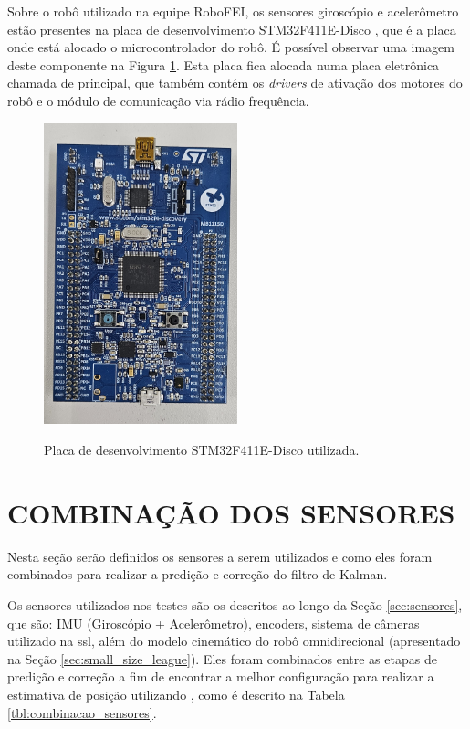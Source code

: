 \documentclass[acronym, symbols, table, deposito]{fei}
\begin{document}
		Sobre o robô utilizado na equipe RoboFEI, os sensores giroscópio e acelerômetro estão presentes na placa de desenvolvimento STM32F411E-Disco \cite{datasheet_micro}, que é a placa onde está alocado o microcontrolador do robô. É possível observar uma imagem deste componente na Figura \ref{fig:stm32f411}. Esta placa fica alocada numa placa eletrônica chamada de principal, que também contém os \textit{drivers} de ativação dos motores do robô e o módulo de comunicação via rádio frequência.
		
		\begin{figure}[!htb]
			\centering
			\caption{Placa de desenvolvimento STM32F411E-Disco utilizada.}
			\includegraphics[width=0.5\textwidth]{stm32f411.jpg}
			\label{fig:stm32f411}
		\end{figure}
		
	\section{COMBINAÇÃO DOS SENSORES}\label{sec:metodologia_comb_sensores}
	
		Nesta seção serão definidos os sensores a serem utilizados e como eles foram combinados para realizar a predição e correção do filtro de Kalman.
		
		Os sensores utilizados nos testes são os descritos ao longo da Seção \ref{sec:sensores}, que são: IMU (Giroscópio + Acelerômetro), encoders, sistema de câmeras utilizado na \acrshort{ssl}, além do modelo cinemático do robô omnidirecional (apresentado na Seção \ref{sec:small_size_league}). Eles foram combinados entre as etapas de predição e correção a fim de encontrar a melhor configuração para realizar a estimativa de posição utilizando , como é descrito na Tabela \ref{tbl:combinacao_sensores}.
		
\end{document}
